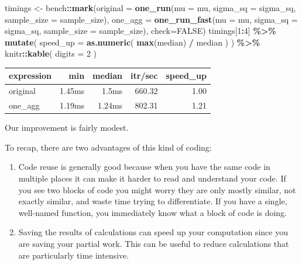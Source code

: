 \documentclass[
]{book}
\newenvironment{Shaded}{\begin{snugshade}}{\end{snugshade}}
\newcommand{\AttributeTok}[1]{\textcolor[rgb]{0.13,0.29,0.53}{#1}}
\newcommand{\ConstantTok}[1]{\textcolor[rgb]{0.56,0.35,0.01}{#1}}
\newcommand{\DecValTok}[1]{\textcolor[rgb]{0.00,0.00,0.81}{#1}}
\newcommand{\FunctionTok}[1]{\textcolor[rgb]{0.13,0.29,0.53}{\textbf{#1}}}
\newcommand{\NormalTok}[1]{#1}
\newcommand{\OtherTok}[1]{\textcolor[rgb]{0.56,0.35,0.01}{#1}}
\newcommand{\SpecialCharTok}[1]{\textcolor[rgb]{0.81,0.36,0.00}{\textbf{#1}}}
\begin{document}
\begin{Shaded}
\begin{Highlighting}[]
\NormalTok{timings }\OtherTok{\textless{}{-}}\NormalTok{ bench}\SpecialCharTok{::}\FunctionTok{mark}\NormalTok{(}\AttributeTok{original =} \FunctionTok{one\_run}\NormalTok{(}\AttributeTok{mu =}\NormalTok{ mu, }\AttributeTok{sigma\_sq =}\NormalTok{ sigma\_sq, }
                                          \AttributeTok{sample\_size =}\NormalTok{ sample\_size),}
                       \AttributeTok{one\_agg =} \FunctionTok{one\_run\_fast}\NormalTok{(}\AttributeTok{mu =}\NormalTok{ mu, }\AttributeTok{sigma\_sq =}\NormalTok{ sigma\_sq, }
                                              \AttributeTok{sample\_size =}\NormalTok{ sample\_size),}
                       \AttributeTok{check=}\ConstantTok{FALSE}\NormalTok{)}
\NormalTok{timings[}\DecValTok{1}\SpecialCharTok{:}\DecValTok{4}\NormalTok{] }\SpecialCharTok{\%\textgreater{}\%}
  \FunctionTok{mutate}\NormalTok{( }\AttributeTok{speed\_up =} \FunctionTok{as.numeric}\NormalTok{( }\FunctionTok{max}\NormalTok{(median) }\SpecialCharTok{/}\NormalTok{ median ) ) }\SpecialCharTok{\%\textgreater{}\%}
\NormalTok{  knitr}\SpecialCharTok{::}\FunctionTok{kable}\NormalTok{( }\AttributeTok{digits =} \DecValTok{2}\NormalTok{ )}
\end{Highlighting}
\end{Shaded}

\begin{tabular}{l|r|r|r|r}
\hline
expression & min & median & itr/sec & speed\_up\\
\hline
original & 1.45ms & 1.5ms & 660.32 & 1.00\\
\hline
one\_agg & 1.19ms & 1.24ms & 802.31 & 1.21\\
\hline
\end{tabular}

Our improvement is fairly modest.

To recap, there are two advantages of this kind of coding:

\begin{enumerate}
\def\labelenumi{\arabic{enumi}.}
\item
  Code reuse is generally good because when you have the same code in multiple places it can make it harder to read and understand your code. If you see two blocks of code you might worry they are only mostly similar, not exactly similar, and waste time trying to differentiate. If you have a single, well-named function, you immediately know what a block of code is doing.
\item
  Saving the results of calculations can speed up your computation since you are saving your partial work. This can be useful to reduce calculations that are particularly time intensive.
\end{enumerate}
\end{document}
